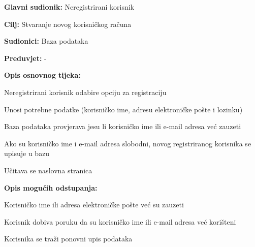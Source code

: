 					\noindent {}
					\begin{packed_item}
						
						\item \textbf{Glavni sudionik: }Neregistrirani korisnik
						\item \textbf{Cilj: }Stvaranje novog korisničkog računa
						\item \textbf{Sudionici: }Baza podataka
						\item \textbf{Preduvjet: }-
						\item \textbf{Opis osnovnog tijeka:}
						\item[] \begin{packed_enum}
							\item Neregistrirani korisnik odabire opciju za registraciju
							\item Unosi potrebne podatke (korisničko ime, adresu elektroničke pošte i lozinku)
							\item Baza podataka provjerava jesu li korisničko ime ili e-mail adresa već zauzeti
							\item Ako su korisničko ime i e-mail adresa slobodni, novog registriranog korisnika se upisuje u bazu
							\item Učitava se naslovna stranica
						\end{packed_enum}
						\item \textbf{Opis mogućih odstupanja:}
						\item[] \begin{packed_enum}
							\item[3.a] Korisničko ime ili adresa elektroničke pošte već su zauzeti
							\begin{packed_enum}
								\item[1.] Korisnik dobiva poruku da su korisničko ime ili e-mail adresa već korišteni
								\item[2.] Korisnika se traži ponovni upis podataka
							\end{packed_enum}
						\end{packed_enum}
					\end{packed_item}
					
